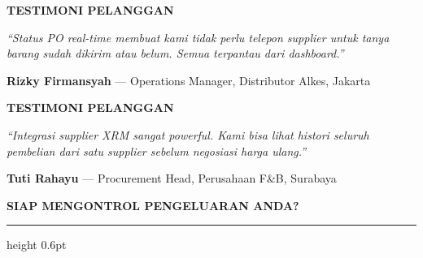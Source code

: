 \documentclass[a4paper]{article}
\newcommand{\sectiontitle}[1]{%
    \vspace{10pt}%
    {\fontsize{13}{16}\selectfont\bfseries\color{BlueDark} #1}\par\vspace{3pt}%
    {\color{BluePrimary}\hrule height 0.6pt}\par\vspace{8pt}}
\begin{document}
\noindent
\begin{minipage}[t]{0.485\textwidth}
    \colorbox{OrangeBg}{%
        \begin{minipage}{\dimexpr\textwidth-2\fboxsep\relax}
            {\fontsize{10}{13}\selectfont\bfseries\color{OrangeDark} TESTIMONI PELANGGAN}
        \end{minipage}}\par
    \vspace{4pt}

    {\fontsize{9}{13}\selectfont\color{TextDark}
    \textit{``Status PO real-time membuat kami tidak perlu telepon supplier untuk tanya barang sudah dikirim atau belum. Semua terpantau dari dashboard.''}

    \vspace{4pt}
    {\bfseries\color{OrangeDark} Rizky Firmansyah} {\color{TextLight}--- Operations Manager, Distributor Alkes, Jakarta}}
\end{minipage}%
\hfill%
\begin{minipage}[t]{0.485\textwidth}
    \colorbox{OrangeBg}{%
        \begin{minipage}{\dimexpr\textwidth-2\fboxsep\relax}
            {\fontsize{10}{13}\selectfont\bfseries\color{OrangeDark} TESTIMONI PELANGGAN}
        \end{minipage}}\par
    \vspace{4pt}

    {\fontsize{9}{13}\selectfont\color{TextDark}
    \textit{``Integrasi supplier XRM sangat powerful. Kami bisa lihat histori seluruh pembelian dari satu supplier sebelum negosiasi harga ulang.''}

    \vspace{4pt}
    {\bfseries\color{OrangeDark} Tuti Rahayu} {\color{TextLight}--- Procurement Head, Perusahaan F\&B, Surabaya}}
\end{minipage}

\vspace{8pt}

\sectiontitle{SIAP MENGONTROL PENGELUARAN ANDA?}
\end{document}
